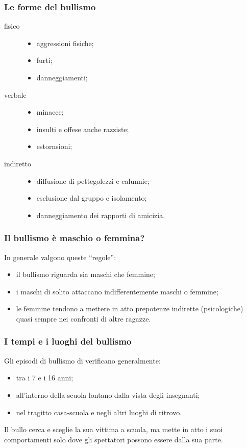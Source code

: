 \documentclass[13pt]{beamer}
\begin{document}
	\begin{frame}
		\frametitle{Le forme del bullismo}
		\begin{description}
			\item[fisico]
			\begin{itemize}
				\item aggressioni fisiche;
				\item furti;
				\item danneggiamenti;
			\end{itemize}
			\item[verbale]
			\begin{itemize}
				\item minacce;
				\item insulti e offese anche razziste;
				\item estornsioni;
			\end{itemize}
			\item[indiretto]
			\begin{itemize}
				\item diffusione di pettegolezzi e calunnie;
				\item esclusione dal gruppo e isolamento;
				\item danneggiamento dei rapporti di amicizia.
			\end{itemize}
		\end{description}
	\end{frame}

	\begin{frame}
		\frametitle{Il bullismo è maschio o femmina?}
		In generale valgono queste ``regole'':
		\begin{itemize}
			\item il bullismo riguarda sia maschi che femmine;
			\item i maschi di solito attaccano indifferentemente maschi o femmine;
			\item le femmine tendono a mettere in atto prepotenze indirette (psicologiche) quasi sempre nei confronti di altre ragazze.
		\end{itemize}
	\end{frame}

	\begin{frame}
		\frametitle{I tempi e i luoghi del bullismo}
		Gli episodi di bullismo di verificano generalmente:
		\begin{itemize}
			\item tra i 7 e i 16 anni;
			\item all'interno della scuola lontano dalla vista degli insegnanti;
			\item nel tragitto casa-scuola e negli altri luoghi di ritrovo.
		\end{itemize}
		Il bullo cerca e sceglie la sua vittima a scuola, ma mette in atto i suoi comportamenti solo dove gli spettatori possono essere dalla sua parte.
	\end{frame}
	
\end{document}
